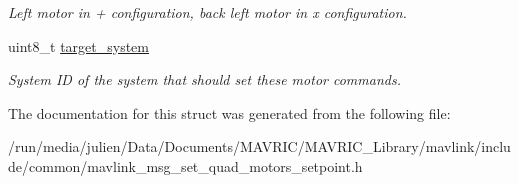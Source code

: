 \begin{DoxyCompactItemize}
\begin{DoxyCompactList}\small\item\em Left motor in + configuration, back left motor in x configuration. \end{DoxyCompactList}\item 
\hypertarget{struct____mavlink__set__quad__motors__setpoint__t_aeb391e4974804e204d36803d9ba51001}{uint8\+\_\+t \hyperlink{struct____mavlink__set__quad__motors__setpoint__t_aeb391e4974804e204d36803d9ba51001}{target\+\_\+system}}\label{struct____mavlink__set__quad__motors__setpoint__t_aeb391e4974804e204d36803d9ba51001}

\begin{DoxyCompactList}\small\item\em System I\+D of the system that should set these motor commands. \end{DoxyCompactList}\end{DoxyCompactItemize}


The documentation for this struct was generated from the following file\+:\begin{DoxyCompactItemize}
\item 
/run/media/julien/\+Data/\+Documents/\+M\+A\+V\+R\+I\+C/\+M\+A\+V\+R\+I\+C\+\_\+\+Library/mavlink/include/common/mavlink\+\_\+msg\+\_\+set\+\_\+quad\+\_\+motors\+\_\+setpoint.\+h\end{DoxyCompactItemize}
